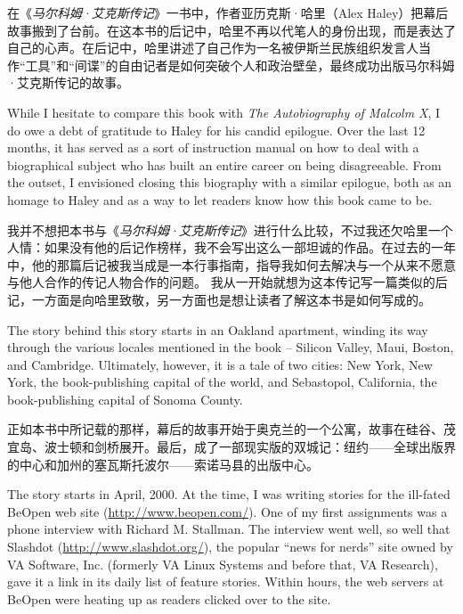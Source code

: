 \ifdefined\chs
在《\textit{马尔科姆·艾克斯传记}》一书中，作者亚历克斯·哈里（Alex Haley）把幕后故事搬到了台前。在这本书的后记中，哈里不再以代笔人的身份出现，而是表达了自己的心声。在后记中，哈里讲述了自己作为一名被伊斯兰民族组织发言人当作``工具''和``间谍''的自由记者是如何突破个人和政治壁垒，最终成功出版马尔科姆·艾克斯传记的故事。
\fi

\ifdefined\eng
While I hesitate to compare this book with \textit{The Autobiography of Malcolm X}, I do owe a debt of gratitude to Haley for his candid epilogue. Over the last 12 months, it has served as a sort of instruction manual on how to deal with a biographical subject who has built an entire career on being disagreeable. %
From the outset, I envisioned closing this biography with a similar epilogue, both as an homage to Haley and as a way to let readers know how this book came to be.
\fi

\ifdefined\chs
我并不想把本书与《\textit{马尔科姆·艾克斯传记}》进行什么比较，不过我还欠哈里一个人情：如果没有他的后记作榜样，我不会写出这么一部坦诚的作品。在过去的一年中，他的那篇后记被我当成是一本行事指南，指导我如何去解决与一个从来不愿意与他人合作的传记人物合作的问题。%
我从一开始就想为这本传记写一篇类似的后记，一方面是向哈里致敬，另一方面也是想让读者了解这本书是如何写成的。
\fi

\ifdefined\eng
The story behind this story starts in an Oakland apartment, winding its way through the various locales mentioned in the book -- Silicon Valley, Maui, Boston, and Cambridge. Ultimately, however, it is a tale of two cities: New York, New York, the book-publishing capital of the world, and Sebastopol, California, the book-publishing capital of Sonoma County.
\fi

\ifdefined\chs
正如本书中所记载的那样，幕后的故事开始于奥克兰的一个公寓，故事在硅谷、茂宜岛、波士顿和剑桥展开。最后，成了一部现实版的双城记：纽约——全球出版界的中心和加州的塞瓦斯托波尔——索诺马县的出版中心。
\fi

\ifdefined\eng
The story starts in April, 2000. At the time, I was writing stories for the ill-fated BeOpen web site (\url{http://www.beopen.com/}). One of my first assignments was a phone interview with Richard M. Stallman. The interview went well, so well that Slashdot (\url{http://www.slashdot.org/}), the popular ``news for nerds'' site owned by VA Software, Inc. (formerly VA Linux Systems and before that, VA Research), gave it a link in its daily list of feature stories. Within hours, the web servers at BeOpen were heating up as readers clicked over to the site.
\fi

